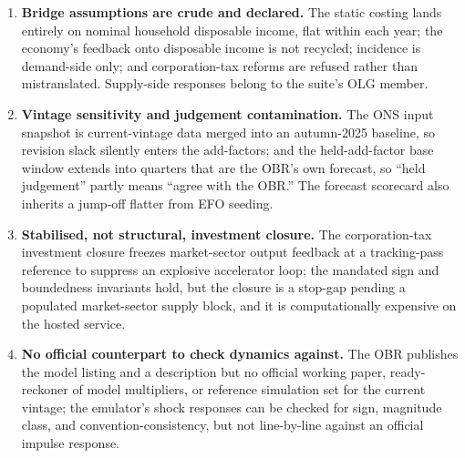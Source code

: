 \begin{enumerate}
\item \textbf{Bridge assumptions are crude and declared.} The static costing lands entirely on nominal household disposable income, flat within each year; the economy's feedback onto disposable income is not recycled; incidence is demand-side only; and corporation-tax reforms are refused rather than mistranslated. Supply-side responses belong to the suite's OLG member.

\item \textbf{Vintage sensitivity and judgement contamination.} The ONS input snapshot is current-vintage data merged into an autumn-2025 baseline, so revision slack silently enters the add-factors; and the held-add-factor base window extends into quarters that are the OBR's own forecast, so ``held judgement'' partly means ``agree with the OBR.'' The forecast scorecard also inherits a jump-off flatter from EFO seeding.

\item \textbf{Stabilised, not structural, investment closure.} The corporation-tax investment closure freezes market-sector output feedback at a tracking-pass reference to suppress an explosive accelerator loop; the mandated sign and boundedness invariants hold, but the closure is a stop-gap pending a populated market-sector supply block, and it is computationally expensive on the hosted service.

\item \textbf{No official counterpart to check dynamics against.} The OBR publishes the model listing and a description \citep{obr2013model} but no official working paper, ready-reckoner of model multipliers, or reference simulation set for the current vintage; the emulator's shock responses can be checked for sign, magnitude class, and convention-consistency, but not line-by-line against an official impulse response.
\end{enumerate}
